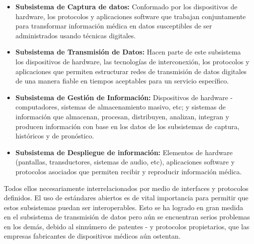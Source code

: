 \begin{itemize}
 \item \textbf{Subsistema de Captura de datos:} Conformado por los dispositivos de hardware, los protocolos y aplicaciones software que trabajan conjuntamente para transformar información médica en datos susceptibles de ser administrados usando técnicas digitales.
 \item \textbf{Subsistema de Transmisión de Datos:} Hacen parte de este subsistema los dispositivos de hardware, las tecnologías de interconexión, los protocolos y aplicaciones que permiten estructurar redes de transmisión de datos digitales de una manera fiable en tiempos aceptables para un servicio específico.
 \item \textbf{Subsistema de Gestión de Información:} Dispositivos de hardware - computadores, sistemas de almacenamiento masivo, etc; y  sistemas de información que almacenan, procesan, distribuyen, analizan, integran y producen información con base en los datos de los subsistemas de captura, históricos y de pronóstico.
 \item \textbf{Subsistema de Despliegue de información:} Elementos de hardware (pantallas, transductores, sistemas de audio, etc), aplicaciones software y protocolos asociados que permiten recibir y reproducir información médica. 
\end{itemize}

Todos ellos necesariamente interrelacionados por medio de interfaces y protocolos definidos. El uso de estándares abiertos es de vital importancia para permitir que estos subsistemas puedan ser interoperables. Esto se ha logrado en gran medida en el subsistema de transmisión de datos pero aún se encuentran serios problemas en los demás, debido al sinnúmero de patentes - y protocolos propietarios, que las empresas fabricantes de dispositivos médicos aún ostentan.
